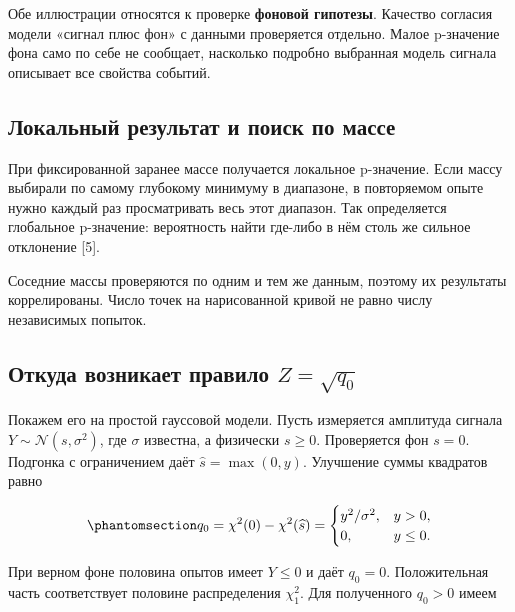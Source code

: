 \documentclass[
  russian,
  11pt,
  a4paper,
  open=any]{scrbook}
\begin{document}
Обе иллюстрации относятся к проверке \textbf{фоновой гипотезы}. Качество
согласия модели «сигнал плюс фон» с данными проверяется отдельно. Малое
p-значение фона само по себе не сообщает, насколько подробно выбранная
модель сигнала описывает все свойства событий.

\subsection{Локальный результат и поиск по
массе}\label{ux43bux43eux43aux430ux43bux44cux43dux44bux439-ux440ux435ux437ux443ux43bux44cux442ux430ux442-ux438-ux43fux43eux438ux441ux43a-ux43fux43e-ux43cux430ux441ux441ux435}

При фиксированной заранее массе получается локальное p-значение. Если
массу выбирали по самому глубокому минимуму в диапазоне, в повторяемом
опыте нужно каждый раз просматривать весь этот диапазон. Так
определяется глобальное p-значение: вероятность найти где-либо в нём
столь же сильное отклонение {[}5{]}.

Соседние массы проверяются по одним и тем же данным, поэтому их
результаты коррелированы. Число точек на нарисованной кривой не равно
числу независимых попыток.

\subsection{\texorpdfstring{Откуда возникает правило
\(Z=\sqrt{q_0}\)}{Откуда возникает правило Z=\textbackslash sqrt\{q\_0\}}}\label{ux43eux442ux43aux443ux434ux430-ux432ux43eux437ux43dux438ux43aux430ux435ux442-ux43fux440ux430ux432ux438ux43bux43e-zsqrtq_0}

Покажем его на простой гауссовой модели. Пусть измеряется амплитуда
сигнала \(Y\sim\mathcal N(s,\sigma^2)\), где \(\sigma\) известна, а
физически \(s\ge0\). Проверяется фон \(s=0\). Подгонка с ограничением
даёт \(\widehat s=\max(0,y)\). Улучшение суммы квадратов равно

\begin{equation}\protect\phantomsection\label{eq-ch13-discovery-statistic}{
q_0=\chi^2(0)-\chi^2(\widehat s)
=
\begin{cases}
y^2/\sigma^2,&y>0,\\
0,&y\le0.
\end{cases}
}\end{equation}

При верном фоне половина опытов имеет \(Y\le0\) и даёт \(q_0=0\).
Положительная часть соответствует половине распределения \(\chi^2_1\).
Для полученного \(q_0>0\) имеем
\end{document}
